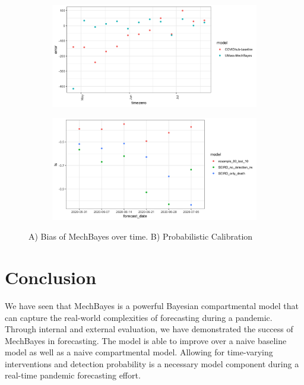 \documentclass[11pt]{amsart}
\begin{document}
\begin{figure}
\begin{subfigure}{.5\textwidth}
\includegraphics[scale=.1]{bias_by_timezero.png}
\end{subfigure}%
\begin{subfigure}{.5\textwidth}
\includegraphics[scale=.1]{ablation_calibration.png}
\end{subfigure}
\caption{A) Bias of MechBayes over time. B) Probabilistic Calibration}
\label{fig:results_discussion}
\end{figure}



\section{Conclusion}

We have seen that MechBayes is a powerful Bayesian compartmental model that can capture the real-world complexities of forecasting during a pandemic. Through internal and external evaluation, we have demonstrated the success of MechBayes in forecasting. The model is able to improve over a naive baseline model as well as a naive compartmental model. Allowing for time-varying interventions and detection probability is a necessary model component during a real-time pandemic forecasting effort. 
\end{document}
